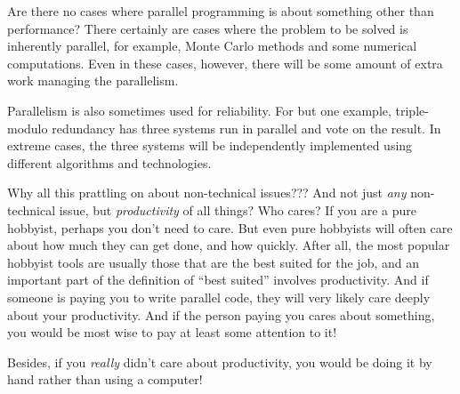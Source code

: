 \QuickQ{}
	Are there no cases where parallel programming is about something
	other than performance?
\QuickA{}
	There certainly are cases where the problem to be solved is
	inherently parallel, for example, Monte Carlo methods and
	some numerical computations.
	Even in these cases, however, there will be some amount of
	extra work managing the parallelism.

	Parallelism is also sometimes used for reliability.
	For but one example,
	triple-modulo redundancy has three systems run in parallel
	and vote on the result.
	In extreme cases, the three systems will be independently
	implemented using different algorithms and technologies.

\QuickQ{}
	Why all this prattling on about non-technical issues???
	And not just \emph{any} non-technical issue, but \emph{productivity}
	of all things?
	Who cares?
\QuickA{}
	If you are a pure hobbyist, perhaps you don't need to care.
	But even pure hobbyists will often care about how much they
	can get done, and how quickly.
	After all, the most popular hobbyist tools are usually those
	that are the best suited for the job, and an important part of
	the definition of ``best suited'' involves productivity.
	And if someone is paying you to write parallel code, they will
	very likely care deeply about your productivity.
	And if the person paying you cares about something, you would
	be most wise to pay at least some attention to it!

	Besides, if you \emph{really} didn't care about productivity,
	you would be doing it by hand rather than using a computer!

